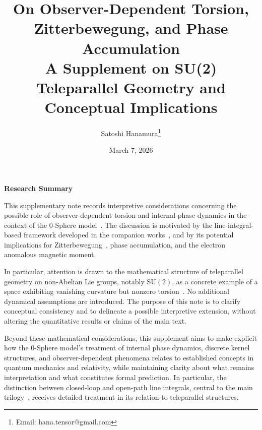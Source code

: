 \documentclass[12pt,letterpaper]{article}
\begin{document}
\title{On Observer-Dependent Torsion,\\ Zitterbewegung, and Phase Accumulation\\
\normalsize A Supplement on SU(2) Teleparallel Geometry and Conceptual Implications}

\author{Satoshi Hanamura\thanks{Email: hana.tensor@gmail.com}}
\date{March 7, 2026}

\maketitle

\tableofcontents

\clearpage

\begin{center}
\textbf{Research Summary}
\end{center}

\justifying
This supplementary note records interpretive considerations concerning the possible role of observer-dependent torsion and internal phase dynamics in the context of the 0-Sphere model~\cite{hanamura16759284}. The discussion is motivated by the line-integral-based framework developed in the companion works~\cite{hanamura18067760,hanamura18135855,hanamura18203433}, and by its potential implications for Zitterbewegung~\cite{Schrodinger1930}, phase accumulation, and the electron anomalous magnetic moment.

In particular, attention is drawn to the mathematical structure of teleparallel geometry on non-Abelian Lie groups, notably $\mathrm{SU}(2)$, as a concrete example of a space exhibiting vanishing curvature but nonzero torsion~\cite{Weitzenbock1923,Aldrovandi2013}. No additional dynamical assumptions are introduced. The purpose of this note is to clarify conceptual consistency and to delineate a possible interpretive extension, without altering the quantitative results or claims of the main text.

Beyond these mathematical considerations, this supplement aims to make explicit how the 0-Sphere model's treatment of internal phase dynamics, discrete kernel structures, and observer-dependent phenomena relates to established concepts in quantum mechanics and relativity, while maintaining clarity about what remains interpretation and what constitutes formal prediction. In particular, the distinction between closed-loop and open-path line integrals, central to the main trilogy~\cite{hanamura18067760,hanamura18135855,hanamura18203433}, receives detailed treatment in its relation to teleparallel structures.
\end{document}
